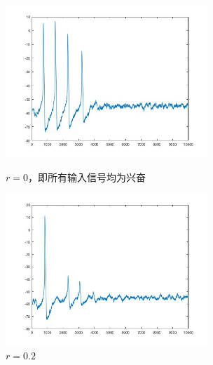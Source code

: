 \documentclass[
bachelor,
nofont, %
pdflinks,
]{xjtuthesis}
\begin{document}
\begin{figure}[!ht]
\begin{minipage}[!ht]{0.5\linewidth}
\centering
\includegraphics[width=3.0in]{p10r0_2.jpg}
\caption{$r=0$，即所有输入信号均为兴奋}
\end{minipage}%
\begin{minipage}[!ht]{0.5\linewidth}
\centering
\includegraphics[width=3.0in]{p10r0_2_2.jpg}
\caption{$r=0.2$}
\end{minipage}
\end{figure}
\end{document}
